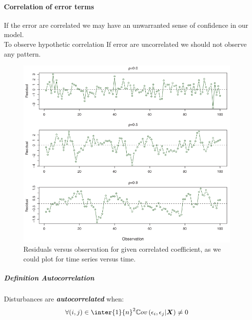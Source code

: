\paragraph{Correlation of error terms}
If the error are correlated we may have an unwarranted sense of 
confidence in our model.\\ To observe hypothetic correlation  If error are uncorrelated we 
should not observe any pattern.
\begin{figure}[H]
	\begin{center}
		\includegraphics[width=.5\textwidth]{./chap/1chap/2sec/2images/2_7residualAsTimeSeries.png}
	\end{center}
	\caption{Residuals versus observation for given correlated
	coefficient, as we could plot for time series versus time.}
	\label{fig:fig2.7}
\end{figure}
\subparagraph{Definition Autocorrelation}
Disturbances are \emph{\textbf{autocorrelated}} when:
$$\forall (i,j)\in\inter{1}{n}^{2}\mathbb{C}ov\left(\epsilon_{i},\epsilon_{j}|\bm{X}\right)\neq0$$

